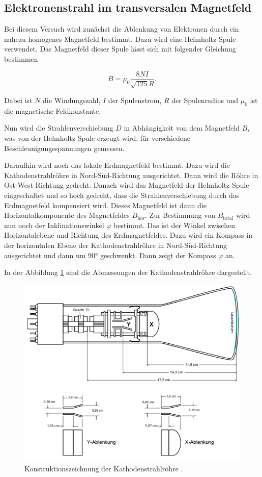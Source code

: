 \subsection{Elektronenstrahl im transversalen Magnetfeld}

Bei diesem Versuch wird zunächst die Ablenkung von Elektronen durch ein nahezu homogenes
Magnetfeld bestimmt. Dazu wird eine Helmholtz-Spule verwendet. Das Magnetfeld dieser
Spule lässt sich mit folgender Gleichung bestimmen

\begin{equation}
  B = \mu_0 \frac{8 N I}{\sqrt{125} R}.
  \label{eq:4}
\end{equation}

Dabei ist $N$ die Windungszahl, $I$ der Spulenstrom, $R$ der Spulenradius und
$\mu_0$ ist die magnetische Feldkonstante.

Nun wird die Strahlenverschiebung $D$ in Abhängigkeit von dem Magnetfeld $B$, was von der
Helmholtz-Spule erzeugt wird, für verschiedene
Beschleunigungsspannungen gemessen.

Daraufhin wird noch das lokale Erdmagnetfeld bestimmt. Dazu wird die Kathodenstrahlröhre
in Nord-Süd-Richtung ausgerichtet. Dann wird die Röhre in Ost-West-Richtung gedreht.
Danach wird das Magnetfeld der Helmholtz-Spule eingeschaltet und so hoch gedreht, dass
die Strahlenverschiebung durch das Erdmagnetfeld kompensiert wird. Dieses Magnetfeld ist dann
die Horizontalkomponente des Magnetfeldes $B_\text{hor}$.
Zur Bestimmung von $B_\text{total}$ wird nun noch der Inklinationswinkel $\varphi$
bestimmt. Das ist der Winkel zwischen Horizontalebene und Richtung des Erdmagnetfeldes. Dazu wird
ein Kompass in der horizontalen Ebene der Kathodenstrahlröhre in Nord-Süd-Richtung ausgerichtet
und dann um $90°$ geschwenkt. Dann zeigt der Kompass $\varphi$ an.


In der Abbildung \ref{abb:5} sind die Abmessungen der Kathodenstrahlröhre dargestellt.

\begin{figure}[H]
  \centering
  \includegraphics[width=\textwidth]{content/Roehre.png}
  \caption{Konstruktionszeichnung der Kathodenstrahlröhre \cite{1}.}
  \label{abb:5}
\end{figure}
